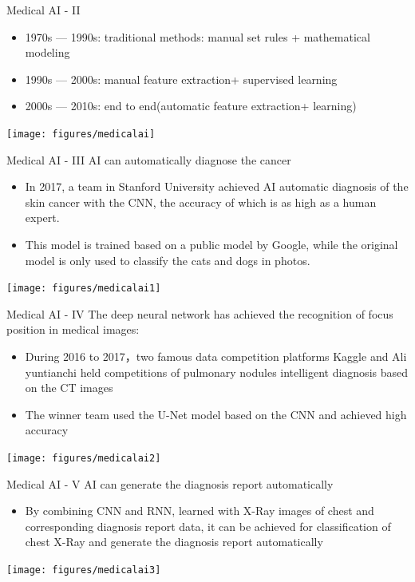 \documentclass{beamer}
\begin{document}
\begin{CJK*}{UTF8}{gbsn}
\begin{frame}{Medical AI - II}
\begin{itemize}
\item 1970s --- 1990s: traditional methods: manual set rules + mathematical modeling 
\item 1990s --- 2000s: manual feature extraction+ supervised learning
\item 2000s --- 2010s:  end to end(automatic feature extraction+ learning)
\end{itemize}
\begin{center}
\texttt{[image: figures/medicalai]}
\end{center}
\end{frame}


\begin{frame}{Medical AI - III}
AI can automatically diagnose the cancer
\begin{itemize}
\item In 2017,  a team in Stanford University achieved AI automatic diagnosis of the skin cancer with the CNN, the accuracy of which is as high as a human expert.
\item This model is trained based on a public model  by Google, while the original model is only used to classify the cats and dogs in photos.
\end{itemize}
\begin{center}
\texttt{[image: figures/medicalai1]}
\end{center}
\end{frame}


\begin{frame}{Medical AI - IV}
The deep neural network has achieved the recognition of focus position in medical images:
\begin{itemize}
\item During 2016 to 2017，two famous data competition platforms Kaggle and Ali yuntianchi held competitions of pulmonary nodules intelligent diagnosis based on the CT images
\item The winner team used the U-Net model based on the CNN and achieved high accuracy
\end{itemize}
\begin{center}
\texttt{[image: figures/medicalai2]}
\end{center}
\end{frame}


\begin{frame}{Medical AI - V}
AI can generate the diagnosis report automatically
\begin{itemize}
\item By combining CNN and RNN, learned with X-Ray images of chest and corresponding diagnosis report data, it can be achieved for classification of chest X-Ray and generate the diagnosis report automatically
\end{itemize}
\begin{center}
\texttt{[image: figures/medicalai3]}
\end{center}
\end{frame}



\end{CJK*}
\end{document}
